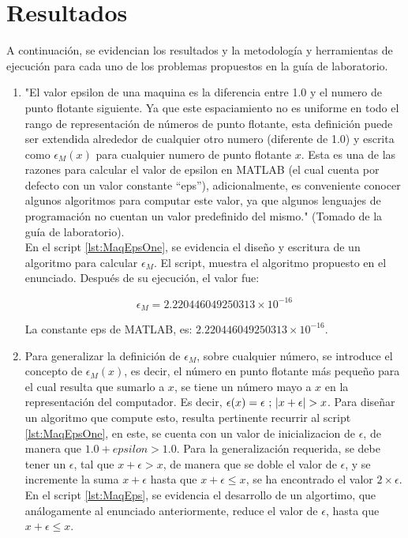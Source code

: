 \documentclass[11pt, spanish]{article}
\begin{document}
\section{Resultados}

A continuación, se evidencian los resultados y la metodología y herramientas de ejecución para cada uno de los problemas propuestos en la guía de laboratorio.

\begin{enumerate}

\item "El valor epsilon de una maquina es la diferencia entre 1.0 y el numero de punto flotante siguiente. Ya que este espaciamiento no es uniforme en todo el rango de representación de números de punto flotante, esta definición puede ser extendida alrededor de cualquier otro numero (diferente de 1.0) y escrita como $\epsilon_M(x)$ para cualquier numero de punto flotante $x$. Esta es una de las razones para calcular el valor de epsilon en \textsc{MATLAB} (el cual cuenta por defecto con un valor constante “eps”), adicionalmente, es conveniente conocer algunos algoritmos para computar este valor, ya que algunos lenguajes de programación no cuentan un valor predefinido del mismo." (Tomado de la guía de laboratorio).\\

En el script \ref{lst:MaqEpsOne}, se evidencia el diseño y escritura de un algoritmo para calcular $\epsilon_M$. El script, muestra el algoritmo propuesto en el enunciado. Después de su ejecución, el valor fue:

$$\epsilon_M = 2.220446049250313 \times 10 ^{-16}$$

La constante eps de \textsc{MATLAB}, es: $2.220446049250313 \times 10^{-16}$.

\item Para generalizar la definición de $\epsilon_M$, sobre cualquier número, se introduce el concepto de $\epsilon_M(x)$, es decir, el número en punto flotante más pequeño para el cual resulta que sumarlo a $x$, se tiene un número mayo a $x$ en la representación del computador. Es decir, $\epsilon(x) = \epsilon \ ;\ \abs{x + \epsilon} > x$. Para diseñar un algoritmo que compute esto, resulta pertinente recurrir al script \ref{lst:MaqEpsOne}, en este, se cuenta con un valor de inicializacion de $\epsilon$, de manera que $1.0 + epsilon > 1.0$. Para la generalización requerida, se debe tener un $\epsilon$, tal que $x + \epsilon > x$, de manera que se doble el valor de $\epsilon$, y se incremente la suma $x + \epsilon$ hasta que $x + \epsilon \leq x$, se ha encontrado el valor $2 \times \epsilon$. En el script \ref{lst:MaqEps}, se evidencia el desarrollo de un algortimo, que análogamente al enunciado anteriormente, reduce el valor de $\epsilon$, hasta que $x + \epsilon \leq x$.


\end{enumerate}
\end{document}
